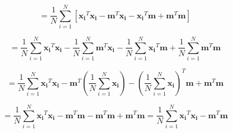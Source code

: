 \documentclass[fleqn]{article}
\begin{document}
\begin{enumerate}
		\begin{equation*}
			 = \frac{1}{N}\sum_{i=1}^{N}\left[\mathbf{x_i}^T\mathbf{x_i}-\mathbf{m}^T\mathbf{x_i}-\mathbf{x_i}^T\mathbf{m}+\mathbf{m}^T\mathbf{m}\right]
		\end{equation*}
		
		\begin{equation*}
			 = \frac{1}{N}\sum_{i=1}^{N}{\mathbf{x_i}^T\mathbf{x_i}}-\frac{1}{N}\sum_{i=1}^{N}{\mathbf{m}^T\mathbf{x_i}}-\frac{1}{N}\sum_{i=1}^{N}{\mathbf{x_i}^T\mathbf{m}}+\frac{1}{N}\sum_{i=1}^{N}{\mathbf{m}^T\mathbf{m}}
		\end{equation*}
				
		\begin{equation*}
			 = \frac{1}{N}\sum_{i=1}^{N}{\mathbf{x_i}^T\mathbf{x_i}}-\mathbf{m}^T\left(\frac{1}{N}\sum_{i=1}^{N}{\mathbf{x_i}}\right)-\left(\frac{1}{N}\sum_{i=1}^{N}{\mathbf{x_i}}\right)^T\mathbf{m}+\mathbf{m}^T\mathbf{m}
		\end{equation*}
		
		\begin{equation*}
			 = \frac{1}{N}\sum_{i=1}^{N}{\mathbf{x_i}^T\mathbf{x_i}}-\mathbf{m}^T\mathbf{m}-\mathbf{m}^T\mathbf{m}+\mathbf{m}^T\mathbf{m} = \frac{1}{N}\sum_{i=1}^{N}{\mathbf{x_i}^T\mathbf{x_i}}-\mathbf{m}^T\mathbf{m}
		\end{equation*}
		
		\end{enumerate}
\end{document}
